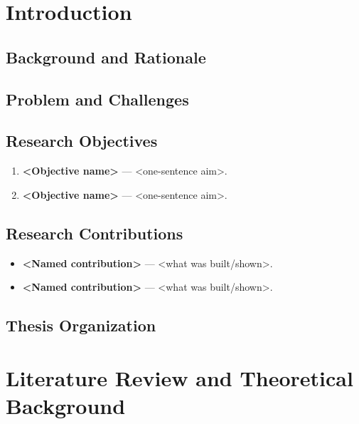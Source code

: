 \documentclass[a4paper, 11pt]{article}
\begin{document}
\section{Introduction}

\subsection{Background and Rationale}

\subsection{Problem and Challenges}

\subsection{Research Objectives}
\begin{enumerate}
  \item \textbf{<Objective name>} --- <one-sentence aim>.
  \item \textbf{<Objective name>} --- <one-sentence aim>.
\end{enumerate}

\subsection{Research Contributions}
\begin{itemize}
  \item \textbf{<Named contribution>} --- <what was built/shown>.
  \item \textbf{<Named contribution>} --- <what was built/shown>.
\end{itemize}

\subsection{Thesis Organization}

\newpage
\section{Literature Review and Theoretical Background}
\end{document}
